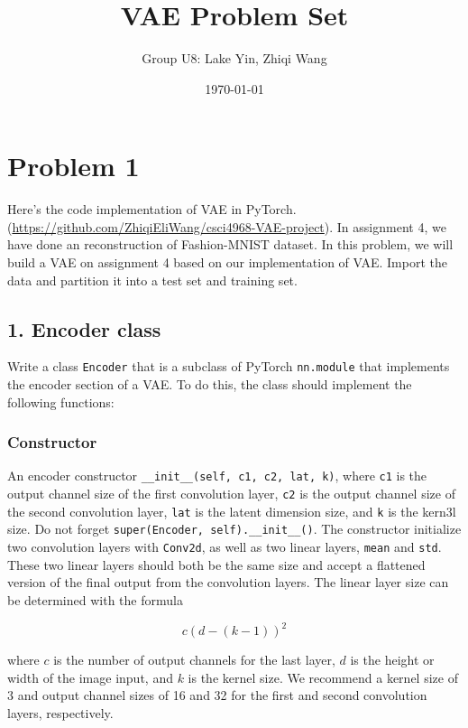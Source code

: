 \documentclass{article}
\begin{document}
\title{\vspace{-3cm}VAE Problem Set}
\author{Group U8: Lake Yin, Zhiqi Wang}
\date{\today}
\maketitle



\section*{Problem 1}

Here's the code implementation of VAE in PyTorch. (\href{https://github.com/ZhiqiEliWang/csci4968-VAE-project}{https://github.com/ZhiqiEliWang/csci4968-VAE-project}). In assignment 4, we have done an reconstruction of Fashion-MNIST dataset. In this problem, we will build a VAE on assignment 4 based on our implementation of VAE. Import the data and partition it into a test set and training set.


\subsection*{1. Encoder class}
Write a class \texttt{Encoder} that is a subclass of PyTorch \texttt{nn.module} that implements the encoder section of a VAE. To do this, the class should implement the following functions:
\subsubsection*{Constructor}
An encoder constructor \texttt{\_\_init\_\_(self, c1, c2, lat, k)}, where \texttt{c1} is the output channel size of the first convolution layer, \texttt{c2} is the output channel size of the second convolution layer, \texttt{lat} is the latent dimension size, and \texttt{k} is the kern3l size. Do not forget \texttt{super(Encoder, self).\_\_init\_\_()}. The constructor initialize two convolution layers with \texttt{Conv2d}, as well as two linear layers, \texttt{mean} and \texttt{std}. These two linear layers should both be the same size and accept a flattened version of the final output from the convolution layers. The linear layer size can be determined with the formula 

\[c(d - (k - 1)) ^ 2\]

where $c$ is the number of output channels for the last layer, $d$ is the height or width of the image input, and $k$ is the kernel size. We recommend a kernel size of 3 and output channel sizes of 16 and 32 for the first and second convolution layers, respectively.
\end{document}
